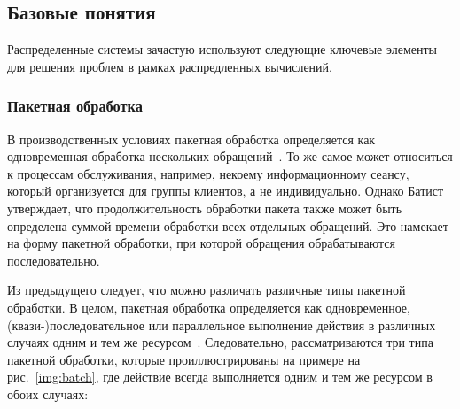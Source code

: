 %

\subsection{Базовые понятия}

Распределенные системы зачастую используют следующие ключевые элементы для решения проблем в рамках распредленных вычислений.

\subsubsection{Пакетная обработка}

В производственных условиях пакетная обработка определяется как одновременная обработка нескольких обращений~\cite{pinedo2012scheduling}. 
То же самое может относиться к процессам обслуживания, например, некоему информационному сеансу, который организуется для группы клиентов, а не индивидуально. 
Однако Батист~\cite{Baptiste2000} утверждает, что продолжительность обработки пакета также может быть определена суммой времени обработки всех отдельных обращений. 
Это намекает на форму пакетной обработки, при которой обращения обрабатываются последовательно. 

Из предыдущего следует, что можно различать различные типы пакетной обработки. 
В целом, пакетная обработка определяется как одновременное, (квази-)последовательное или параллельное выполнение действия в различных случаях одним и тем же ресурсом~\cite{Martin2015BatchPD}. 
Следовательно, рассматриваются три типа пакетной обработки, которые проиллюстрированы на примере на рис.~\ref{img:batch}, где действие всегда выполняется одним и тем же ресурсом в обоих случаях:

